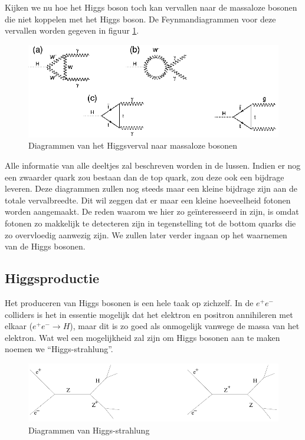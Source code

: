 \documentclass[../main.tex]{subfiles}
\begin{document}
Kijken we nu hoe het Higgs boson toch kan vervallen naar de massaloze bosonen die niet koppelen met het Higgs boson. De Feynmandiagrammen voor deze vervallen worden gegeven in figuur \ref{fig:higgs_boson/h_naar_foton_gluon}.

\begin{figure}[h]
    \centering
    \includegraphics[width=0.8\linewidth]{higgs_boson/h_naar_foton_gluon.png}
    \caption{Diagrammen van het Higgsverval naar massaloze bosonen}%
    \label{fig:higgs_boson/h_naar_foton_gluon}
\end{figure}

Alle informatie van alle deeltjes zal beschreven worden in de lussen. Indien er nog een zwaarder quark zou bestaan dan de top quark, zou deze ook een bijdrage leveren. Deze diagrammen zullen nog steeds maar een kleine bijdrage zijn aan de totale vervalbreedte. Dit wil zeggen dat er maar een kleine hoeveelheid fotonen worden aangemaakt. De reden waarom we hier zo geïnteresseerd in zijn, is omdat fotonen zo makkelijk te detecteren zijn in tegenstelling tot de bottom quarks die zo overvloedig aanwezig zijn. We zullen later verder ingaan op het waarnemen van de Higgs bosonen.

\subsection{Higgsproductie}%
\label{sub:higgs_productie}

Het produceren van Higgs bosonen is een hele taak op zichzelf. In de $e^+e^-$ colliders is het in essentie mogelijk dat het elektron en positron annihileren met elkaar ($e^+e^-\rightarrow H$), maar dit is zo goed als onmogelijk vanwege de massa van het elektron. Wat wel een mogelijkheid zal zijn om Higgs bosonen aan te maken noemen we ``Higgs-strahlung''.

\begin{figure}[h]
    \centering
    \includegraphics[width=0.6\linewidth]{higgs_boson/Higgs_strahlung.png}
    \caption{Diagrammen van Higgs-strahlung}%
    \label{fig:higgs_boson/Higgs_strahlung}
\end{figure}
\end{document}
